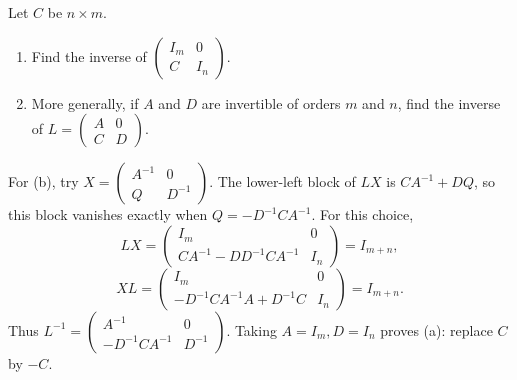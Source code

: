 \begin{problem}\label{ex:02:triangular-block-inverse}
Let $C$ be $n\times m$.
\begin{enumerate}
\item Find the inverse of $\begin{pmatrix}I_m&0\\C&I_n\end{pmatrix}$.
\item More generally, if $A$ and $D$ are invertible of orders $m$ and $n$,
find the inverse of $L=\begin{pmatrix}A&0\\C&D\end{pmatrix}$.
\end{enumerate}
\end{problem}
\begin{solution}
For (b), try $X=\begin{pmatrix}A^{-1}&0\\Q&D^{-1}\end{pmatrix}$.
The lower-left block of $LX$ is $CA^{-1}+DQ$, so this block vanishes
exactly when $Q=-D^{-1}CA^{-1}$. For this choice,
\[
LX=\begin{pmatrix}I_m&0\\CA^{-1}-DD^{-1}CA^{-1}&I_n\end{pmatrix}=I_{m+n},
\]
\[
XL=\begin{pmatrix}I_m&0\\-D^{-1}CA^{-1}A+D^{-1}C&I_n\end{pmatrix}=I_{m+n}.
\]
Thus $L^{-1}=\begin{pmatrix}A^{-1}&0\\-D^{-1}CA^{-1}&D^{-1}\end{pmatrix}$.
Taking $A=I_m,D=I_n$ proves (a): replace $C$ by $-C$.
\end{solution}

